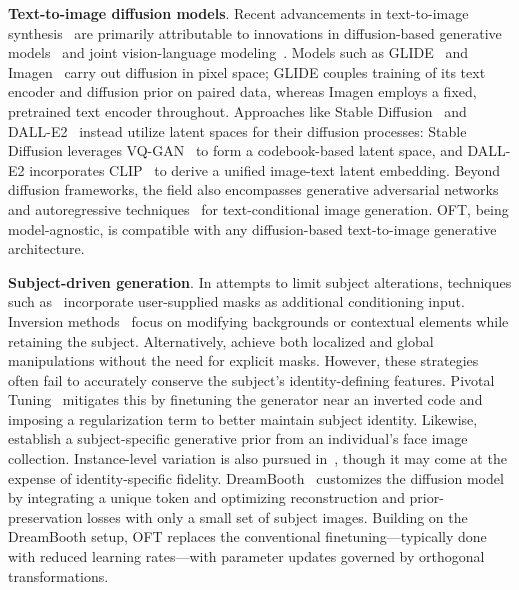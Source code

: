 \textbf{Text-to-image diffusion models}. Recent advancements in text-to-image synthesis~\cite{saharia2022photorealistic,ramesh2022hierarchical,rombach2022high,gu2022vector,nichol2022glide} are primarily attributable to innovations in diffusion-based generative models~\cite{ho2020denoising,song2021score,song2021denoising,dhariwal2021diffusion} and joint vision-language modeling~\cite{su2020vlbert,lu2019vilbert,radford2021learning,wang2021simvlm,li2022blip,li2023blip,alayrac2022flamingo,schuhmann2022laion}. Models such as GLIDE~\cite{nichol2022glide} and Imagen~\cite{saharia2022photorealistic} carry out diffusion in pixel space; GLIDE couples training of its text encoder and diffusion prior on paired data, whereas Imagen employs a fixed, pretrained text encoder throughout. Approaches like Stable Diffusion~\cite{rombach2022high} and DALL-E2~\cite{ramesh2022hierarchical} instead utilize latent spaces for their diffusion processes: Stable Diffusion leverages VQ-GAN~\cite{esser2021taming} to form a codebook-based latent space, and DALL-E2 incorporates CLIP~\cite{radford2021learning} to derive a unified image-text latent embedding. Beyond diffusion frameworks, the field also encompasses generative adversarial networks~\cite{reed2016generative,zhang2017stackgan,xu2018attngan,li2019controllable} and autoregressive techniques~\cite{ramesh2021zero,ding2021cogview,wu2022nuwa,yuscaling} for text-conditional image generation. OFT, being model-agnostic, is compatible with any diffusion-based text-to-image generative architecture.

\textbf{Subject-driven generation}. In attempts to limit subject alterations, techniques such as~\cite{avrahami2022blended,nichol2022glide} incorporate user-supplied masks as additional conditioning input. Inversion methods~\cite{choi2021ilvr,dhariwal2021diffusion,ramesh2022hierarchical,gal2022image} focus on modifying backgrounds or contextual elements while retaining the subject. Alternatively, \cite{hertz2022prompt} achieve both localized and global manipulations without the need for explicit masks. However, these strategies often fail to accurately conserve the subject’s identity-defining features. Pivotal Tuning~\cite{roich2022pivotal} mitigates this by finetuning the generator near an inverted code and imposing a regularization term to better maintain subject identity. Likewise, \cite{nitzan2022mystyle} establish a subject-specific generative prior from an individual's face image collection. Instance-level variation is also pursued in~\cite{casanova2021instance}, though it may come at the expense of identity-specific fidelity. DreamBooth~\cite{ruiz2023dreambooth} customizes the diffusion model by integrating a unique token and optimizing reconstruction and prior-preservation losses with only a small set of subject images. Building on the DreamBooth setup, OFT replaces the conventional finetuning—typically done with reduced learning rates—with parameter updates governed by orthogonal transformations.

